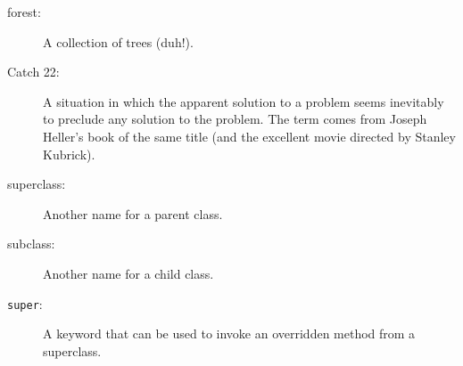 \documentclass[12pt]{book}
\theoremstyle{exercise}
\begin{document}
\begin{description}

\item[forest:] A collection of trees (duh!).

\item[Catch 22:] A situation in which the apparent solution to
a problem seems inevitably to preclude any solution to the problem.
The term comes from Joseph Heller's book of the same title (and
the excellent movie directed by Stanley Kubrick).


\item[superclass:] Another name for a parent class.

\item[subclass:] Another name for a child class.

\item[{\tt super}:] A keyword that can be used to invoke an overridden
method from a superclass.

\end{description}




\printindex

\clearemptydoublepage
\end{document}
